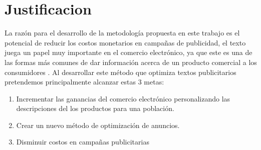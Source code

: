 \section{Justificacion}

La razón para el desarrollo de la metodología propuesta en este trabajo es el potencial de reducir los costos monetarios en campañas de publicidad, el texto juega un papel muy importante en el comercio electrónico, ya que este es una de las formas más comunes de dar información acerca de un producto comercial a los consumidores \cite{mcquarrie1999visual}. Al desarrollar este método que optimiza textos publicitarios pretendemos principalmente alcanzar estas 3 metas:

\begin{enumerate}
\item Incrementar las ganancias del comercio electrónico personalizando las descripciones del  los productos para una población. 
\item Crear un nuevo método de optimización de anuncios.
\item Disminuir costos en campañas publicitarias
\end{enumerate}
